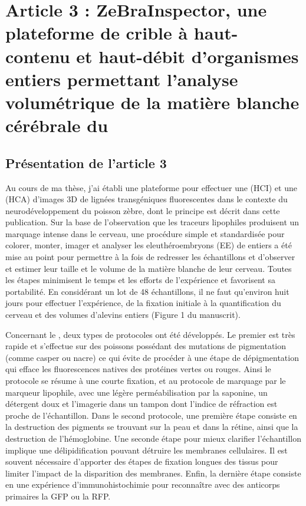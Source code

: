 \documentclass[\main/main.tex]{subfiles}
\begin{document}
\chapter{
    \label{sec:lempereur_bio}
    Article 3 : ZeBraInspector, une plateforme de crible à haut-contenu et haut-débit d'organismes entiers permettant l'analyse volumétrique de la matière blanche cérébrale du \pz{}
    }

\section{Présentation de l'article 3}
    
Au cours de ma thèse, j'ai établi une plateforme pour effectuer une \hci (HCI) et une \hca (HCA) d'images 3D de lignées transgéniques fluorescentes dans le contexte du neurodéveloppement du poisson zèbre, dont le principe est décrit dans cette publication. Sur la base de l'observation que les traceurs lipophiles produisent un marquage intense dans le cerveau, une procédure simple et standardisée pour colorer, monter, imager et analyser les eleuthéroembryons (EE) de \pz{} entiers a été mise au point pour permettre à la fois de redresser les échantillons et d'observer et estimer leur taille et le volume de la matière blanche de leur cerveau. Toutes les étapes minimisent le temps et les efforts de l'expérience et favorisent sa portabilité. En considérant un lot de 48 échantillons, il ne faut qu'environ huit jours pour effectuer l'expérience, de la fixation initiale à la quantification du cerveau et des volumes d'alevins entiers (Figure 1 du manuscrit).

%
Concernant le \pz{}, deux types de protocoles ont été développés.
Le premier est très rapide et s'effectue sur des poissons possédant des mutations de pigmentation (comme casper ou nacre) ce qui évite de procéder à une étape de dépigmentation qui efface les fluorescences natives des protéines vertes ou rouges. Ainsi le protocole se résume à une courte fixation, et au protocole de marquage par le marqueur lipophile, avec une légère perméabilisation par la saponine, un détergent doux et l'imagerie dans un tampon dont l'indice de réfraction est proche de l'échantillon.
Dans le second protocole, une première étape consiste en la destruction des pigments se trouvant sur la peau
et dans la rétine, ainsi que la destruction de l'hémoglobine.
%
Une seconde étape pour mieux clarifier l'échantillon implique une  délipidification pouvant détruire les membranes cellulaires. Il est souvent nécessaire d'apporter des étapes de fixation longues des tissus pour limiter l'impact de la disparition des membranes.
%
Enfin, la dernière étape consiste en une expérience d'immunohistochimie pour reconnaître avec des anticorps primaires la GFP ou la RFP.
\end{document}
